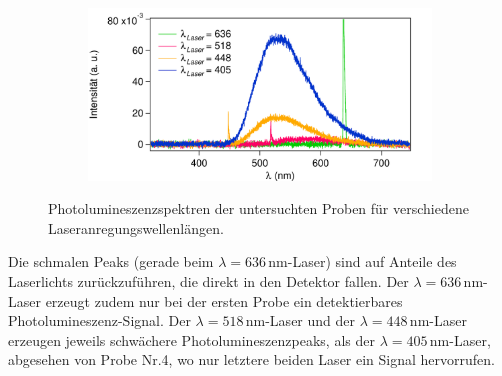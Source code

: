 \begin{figure}[H]
\begin{subfigure}{0.49\textwidth}
        \caption{}
        \label{fig:A3}
    \end{subfigure}
    \begin{subfigure}{0.49\textwidth}
        \includegraphics[width=\textwidth]{bilder/Nr4_Laser.pdf}
        \caption{}
        \label{fig:A4}
    \end{subfigure}
    \caption{Photolumineszenzspektren der untersuchten Proben für verschiedene Laseranregungswellenlängen.}
    \label{fig:Laserwellenlänge}
\end{figure}


Die schmalen Peaks (gerade beim $\lambda=636\,\si{\nano\meter}$-Laser)
sind auf Anteile des Laserlichts zurückzuführen, die direkt in den Detektor fallen.
Der $\lambda=636\,\si{\nano\meter}$-Laser erzeugt zudem nur bei der ersten Probe ein detektierbares Photolumineszenz-Signal.
Der $\lambda=518\,\si{\nano\meter}$-Laser und der $\lambda=448\,\si{\nano\meter}$-Laser
erzeugen jeweils schwächere Photolumineszenzpeaks, als der $\lambda=405\,\si{\nano\meter}$-Laser,
abgesehen von Probe Nr.4, wo nur letztere beiden Laser ein Signal hervorrufen.


